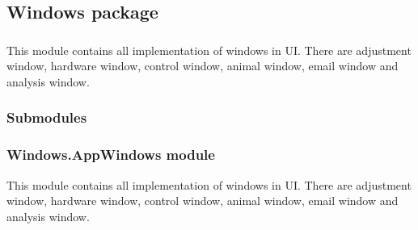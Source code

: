 \documentclass[letterpaper,10pt,english]{sphinxmanual}
\begin{document}
\sphinxstepscope


\subsection{Windows package}
\label{\detokenize{NoSeMazeController/Windows:windows-package}}\label{\detokenize{NoSeMazeController/Windows::doc}}

\subsubsection{}
\label{\detokenize{NoSeMazeController/Windows:id1}}
\sphinxAtStartPar
This module contains all implementation of windows in UI. There are adjustment window, hardware window, control window, animal window, e\sphinxhyphen{}mail window and analysis window.


\subsubsection{Submodules}
\label{\detokenize{NoSeMazeController/Windows:submodules}}

\subsubsection{Windows.AppWindows module}
\label{\detokenize{NoSeMazeController/Windows:module-Windows.AppWindows}}\label{\detokenize{NoSeMazeController/Windows:windows-appwindows-module}}
\sphinxAtStartPar
This module contains all implementation of windows in UI. There are adjustment
window, hardware window, control window, animal window, e\sphinxhyphen{}mail window and
analysis window.
\end{document}

